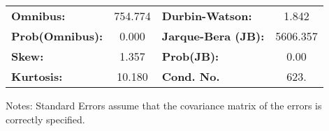 \begin{center}
\begin{tabular}{lcccccc}
\bottomrule
\end{tabular}
\begin{tabular}{lclc}
\textbf{Omnibus:}       & 754.774 & \textbf{  Durbin-Watson:     } &    1.842  \\
\textbf{Prob(Omnibus):} &   0.000 & \textbf{  Jarque-Bera (JB):  } & 5606.357  \\
\textbf{Skew:}          &   1.357 & \textbf{  Prob(JB):          } &     0.00  \\
\textbf{Kurtosis:}      &  10.180 & \textbf{  Cond. No.          } &     623.  \\
\bottomrule
\end{tabular}
\end{center}

Notes: \newline
 [1] Standard Errors assume that the covariance matrix of the errors is correctly specified.